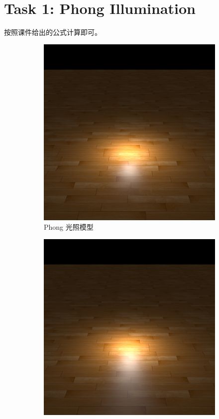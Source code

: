 \documentclass[UTF8]{ctexart}
\begin{document}
\section*{Task 1: Phong Illumination}

按照课件给出的公式计算即可。

\begin{figure}[htbp]
    \begin{subfigure}[b]{0.49\textwidth}
        \centering
        \includegraphics[width=\textwidth]{images/1-1.png}
        \caption{Phong 光照模型}
    \end{subfigure}
    \hfill
    \begin{subfigure}[b]{0.49\textwidth}
        \centering
        \includegraphics[width=\textwidth]{images/1-2.png}

\end{subfigure}
\end{figure}
\end{document}
